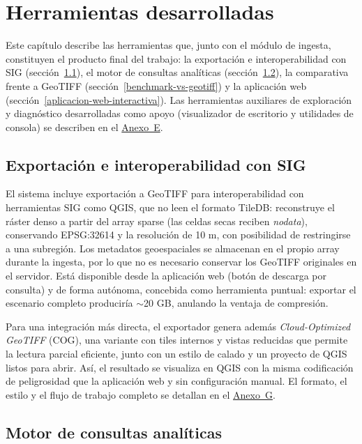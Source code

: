 \chapter{Herramientas desarrolladas}\label{herramientas-desarrolladas}

Este capítulo describe las herramientas que, junto con el módulo de ingesta, constituyen el producto final del trabajo: la exportación e interoperabilidad con SIG (sección~\ref{exportacion-a-geotiff}), el motor de consultas analíticas (sección~\ref{motor-de-consultas-analiticas}), la comparativa frente a GeoTIFF (sección~\ref{benchmark-vs-geotiff}) y la aplicación web (sección~\ref{aplicacion-web-interactiva}). Las herramientas auxiliares de exploración y diagnóstico desarrolladas como apoyo (visualizador de escritorio y utilidades de consola) se describen en el \hyperref[anexo-e.-guia-de-despliegue]{Anexo~E}.

\section{Exportación e interoperabilidad con SIG}\label{exportacion-a-geotiff}

El sistema incluye exportación a GeoTIFF para interoperabilidad con herramientas SIG como QGIS, que no leen el formato TileDB: reconstruye el ráster denso a partir del array sparse (las celdas secas reciben \textit{nodata}), conservando EPSG:32614 y la resolución de 10 m, con posibilidad de restringirse a una subregión. Los metadatos geoespaciales se almacenan en el propio array durante la ingesta, por lo que no es necesario conservar los GeoTIFF originales en el servidor. Está disponible desde la aplicación web (botón de descarga por consulta) y de forma autónoma, concebida como herramienta puntual: exportar el escenario completo produciría $\sim$20 GB, anulando la ventaja de compresión.

Para una integración más directa, el exportador genera además \textit{Cloud-Optimized GeoTIFF} (COG), una variante con tiles internos y vistas reducidas que permite la lectura parcial eficiente, junto con un estilo de calado y un proyecto de QGIS listos para abrir. Así, el resultado se visualiza en QGIS con la misma codificación de peligrosidad que la aplicación web y sin configuración manual. El formato, el estilo y el flujo de trabajo completo se detallan en el \hyperref[anexo-g.-interoperabilidad-gis]{Anexo~G}.

\section{Motor de consultas analíticas}\label{motor-de-consultas-analiticas}

